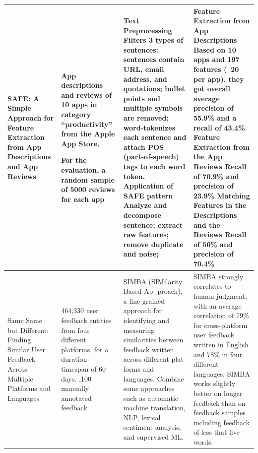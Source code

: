 \documentclass[12pt]{article}
\begin{document}
\begin{table}
\begin{tabular}{|p{2cm}|p{2cm}|p{4cm}|p{5cm}|}
\hline
\centering
SAFE: A Simple Approach for Feature Extraction from App Descriptions and App Reviews \cite{safe_paper}
&
App descriptions and reviews of 10 apps in category “productivity” from the Apple App Store.\newline

For the evaluation, a random sample of 5000 reviews for each app
&
\textbf{Text Preprocessing}\newline
Filters 3 types of sentences: sentences contain URL, email address, and quotations; bullet points and multiple symbols are removed; word-tokenizes each sentence and attach POS (part-of-speech) tags to each word token.
\newline
\newline
\textbf{Application of SAFE pattern}\newline
Analyze and decompose sentence; extract raw features; remove duplicate and noise;
&
\textbf{Feature Extraction from App Descriptions}
Based on 10 apps and 197 features (~20 per app), they got overall average precision of 55.9\% and a recall of 43.4\%
\newline\newline
\textbf{Feature Extraction from the App Reviews}
Recall of 70.9\% and precision of 23.9\%
\newline\newline
\textbf{Matching Features in the Descriptions and the Reviews}
Recall of 56\% and precision of 70.4\%
\\
\hline
Same Same but Different: Finding Similar User Feedback Across Multiple Platforms and Languages \cite{simba_paper}
&
464,330 user feedback entities from four different platforms, for a duration timespan of 60 days.
\newline\newline
4,100 manually annotated feedback.
&
SIMBA (SIMilarity Based Ap-
proach), a fine-grained approach for identifying and measuring
similarities between feedback written across different plat-
forms and languages.
\newline\newline
Combine some approaches such as automatic machine translation, NLP, lexical sentiment analysis, and supervised ML.

&
SIMBA strongly correlates to human judgment, with an average correlation of 79\% for cross-platform user feedback written in English and 78\% in four different languages.
\newline\newline
SIMBA works slightly better on longer feedback than on
feedback samples including feedback of less that five words.
\\
\end{tabular}
\hline
\end{table}
\end{document}
